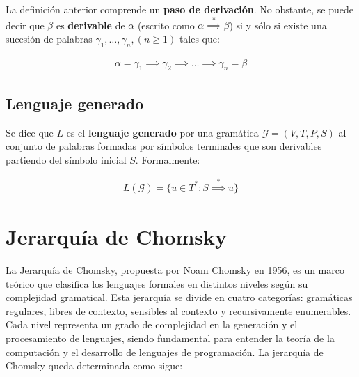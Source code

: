 La definición anterior comprende un \textbf{paso de derivación}. No obstante, se puede decir que $\beta$ es \textbf{derivable} de $\alpha$ (escrito como $\alpha \overset{*}{\implies} \beta$) si y sólo si existe una sucesión de palabras $\gamma_1,\ldots,\gamma_n, (n \geq 1)$ tales que:

\begin{align*}
    \alpha = \gamma_1 \implies \gamma_2 \implies \ldots \implies \gamma_n = \beta
\end{align*}

\subsection{Lenguaje generado}\label{subsection:gramaticalanguage}
Se dice que $L$ es el \textbf{lenguaje generado} por una gramática $\mathcal{G} = (V,T,P,S)$ al conjunto de palabras formadas por símbolos terminales que son derivables partiendo del símbolo inicial $S$. Formalmente:

\begin{align*}
    L(\mathcal{G}) = \lbrace u \in T^* : S \overset{*}{\implies} u \rbrace
\end{align*}

\section{Jerarquía de Chomsky}\label{section:chomsky}
La Jerarquía de Chomsky, propuesta por Noam Chomsky en 1956, es un marco teórico que clasifica los lenguajes formales en distintos niveles según su complejidad gramatical. Esta jerarquía se divide en cuatro categorías: gramáticas regulares, libres de contexto, sensibles al contexto y recursivamente enumerables. Cada nivel representa un grado de complejidad en la generación y el procesamiento de lenguajes, siendo fundamental para entender la teoría de la computación y el desarrollo de lenguajes de programación. La jerarquía de Chomsky queda determinada como sigue:

